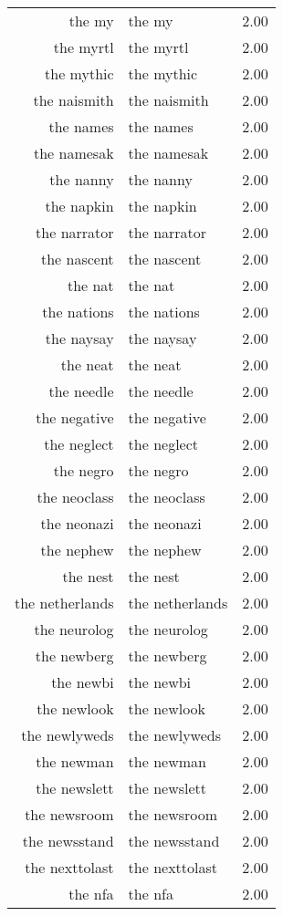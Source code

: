 \begin{table}[ht]
\begin{tabular}{rlr}
  the my & the my & 2.00 \\ 
  the myrtl & the myrtl & 2.00 \\ 
  the mythic & the mythic & 2.00 \\ 
  the naismith & the naismith & 2.00 \\ 
  the names & the names & 2.00 \\ 
  the namesak & the namesak & 2.00 \\ 
  the nanny & the nanny & 2.00 \\ 
  the napkin & the napkin & 2.00 \\ 
  the narrator & the narrator & 2.00 \\ 
  the nascent & the nascent & 2.00 \\ 
  the nat & the nat & 2.00 \\ 
  the nations & the nations & 2.00 \\ 
  the naysay & the naysay & 2.00 \\ 
  the neat & the neat & 2.00 \\ 
  the needle & the needle & 2.00 \\ 
  the negative & the negative & 2.00 \\ 
  the neglect & the neglect & 2.00 \\ 
  the negro & the negro & 2.00 \\ 
  the neoclass & the neoclass & 2.00 \\ 
  the neonazi & the neonazi & 2.00 \\ 
  the nephew & the nephew & 2.00 \\ 
  the nest & the nest & 2.00 \\ 
  the netherlands & the netherlands & 2.00 \\ 
  the neurolog & the neurolog & 2.00 \\ 
  the newberg & the newberg & 2.00 \\ 
  the newbi & the newbi & 2.00 \\ 
  the newlook & the newlook & 2.00 \\ 
  the newlyweds & the newlyweds & 2.00 \\ 
  the newman & the newman & 2.00 \\ 
  the newslett & the newslett & 2.00 \\ 
  the newsroom & the newsroom & 2.00 \\ 
  the newsstand & the newsstand & 2.00 \\ 
  the nexttolast & the nexttolast & 2.00 \\ 
  the nfa & the nfa & 2.00 \\ 

\end{tabular}
\end{table}
